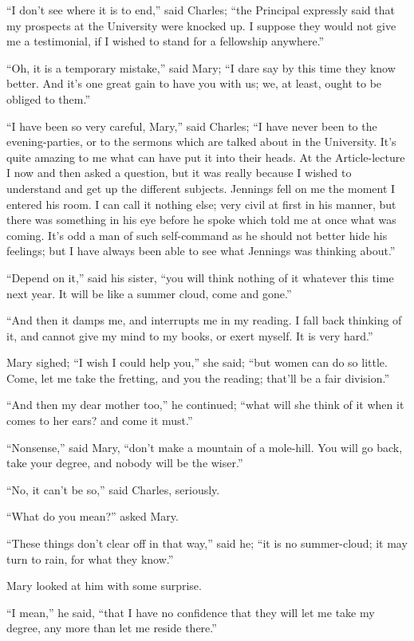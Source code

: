 ``I don't see where it is to end,'' said Charles; ``the
Principal expressly said that my prospects at the University were
knocked up. I suppose they would not give me a testimonial, if I
wished to stand for a fellowship anywhere.''

``Oh, it is a temporary mistake,'' said Mary; ``I dare
say by this time they know better. And it's one great gain to have you
with us; we, at least, ought to be obliged to them.''

``I have been so very careful, Mary,'' said Charles;
``I have never been to the evening-parties, or to the sermons
which are talked about in the University. It's quite amazing to me
what can have put it into their heads. At the Article-lecture I now
and then asked a question, but it was really because I wished to
understand and get up the different subjects. Jennings fell on me the
moment I entered his room. I can call it nothing else; very civil at
first in his manner, but there was something in his eye before he
spoke which told me at once what was coming. It's odd a man of such
self-command as he should not better hide his feelings; but I have
always been able to see what Jennings was thinking about.''

``Depend on it,'' said his sister, ``you will think
nothing of it whatever this time next year. It will be like a summer
cloud, come and gone.''

``And then it damps me, and interrupts me in my reading. I fall
back thinking of it, and cannot give my mind to my books, or exert
myself. It is very hard.''

Mary sighed; ``I wish I could help you,'' she said;
``but women can do so little. Come, let me take the fretting, and
you the reading; that'll be a fair division.''

``And then my dear mother too,'' he continued; ``what
will she think of it when it comes to her ears? and come it
must.''

``Nonsense,'' said Mary, ``don't make a mountain of
a mole-hill. You will go back, take your degree, and nobody will
be the wiser.''

``No, it can't be so,'' said Charles, seriously.

``What do you mean?'' asked Mary.

``These things don't clear off in that way,'' said he;
``it is no summer-cloud; it may turn to rain, for what they
know.''

Mary looked at him with some surprise.

``I mean,'' he said, ``that I have no confidence that
they will let me take my degree, any more than let me reside
there.''

